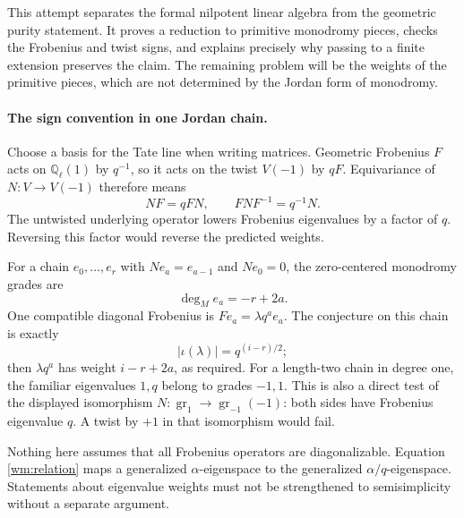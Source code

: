 \documentclass[11pt]{article}
\begin{document}
This attempt separates the formal nilpotent linear algebra from the
geometric purity statement. It proves a reduction to primitive monodromy
pieces, checks the Frobenius and twist signs, and explains precisely why
passing to a finite extension preserves the claim. The remaining problem
will be the weights of the primitive pieces, which are not determined
by the Jordan form of monodromy.

\paragraph{The sign convention in one Jordan chain.}
Choose a basis for the Tate line when writing matrices. Geometric
Frobenius $F$ acts on $\mathbb Q_\ell(1)$ by $q^{-1}$, so it acts
on the twist $V(-1)$ by $qF$. Equivariance of
$N:V\to V(-1)$ therefore means
\begin{equation}\label{wm:relation}
 NF=qFN,\qquad FNF^{-1}=q^{-1}N.
\end{equation}
The untwisted underlying operator lowers Frobenius eigenvalues by a
factor of $q$. Reversing this factor would reverse the predicted weights.

For a chain $e_0,\ldots,e_r$ with $Ne_a=e_{a-1}$ and $Ne_0=0$,
the zero-centered monodromy grades are
\[
 \deg_M e_a=-r+2a.
\]
One compatible diagonal Frobenius is $Fe_a=\lambda q^a e_a$.
The conjecture on this chain is exactly
\[
 |\iota(\lambda)|=q^{(i-r)/2};
\]
then $\lambda q^a$ has weight $i-r+2a$, as required. For a length-two
chain in degree one, the familiar eigenvalues $1,q$ belong to grades
$-1,1$. This is also a direct test of the displayed isomorphism
$N:\operatorname{gr}_1\to\operatorname{gr}_{-1}(-1)$: both sides have
Frobenius eigenvalue $q$. A twist by $+1$ in that isomorphism would fail.

Nothing here assumes that all Frobenius operators are diagonalizable.
Equation \eqref{wm:relation} maps a generalized $\alpha$-eigenspace
to the generalized $\alpha/q$-eigenspace. Statements about eigenvalue
weights must not be strengthened to semisimplicity without a separate
argument.
\end{document}
